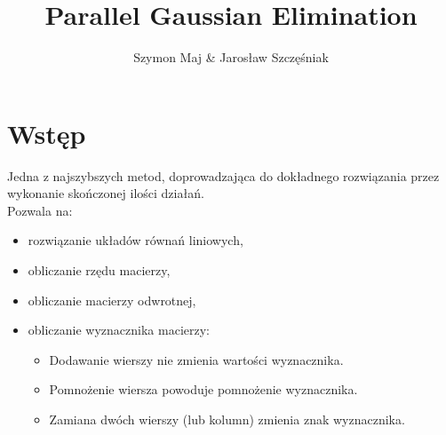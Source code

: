 \documentclass{beamer}
\title{Parallel Gaussian Elimination}
\author{Szymon Maj \& Jarosław Szczęśniak}
\institute{Akademia Górniczo-Hutnicza im. Stanisława Staszica w Krakowie}
\begin{document}
\lstset{breakatwhitespace=true,
language=C++,
columns=fullflexible,
keepspaces=true,
breaklines=true,
tabsize=3, 
showstringspaces=false,
extendedchars=true,
numbers=left,
numberstyle=\tiny,
frame=leftline}


	\begin{frame}
		\titlepage
	\end{frame}

	\section{Wstęp}
	\begin{frame}
		Jedna z najszybszych metod, doprowadzająca do dokładnego rozwiązania przez wykonanie skończonej ilości działań.
		\newline \\
		Pozwala na:
		\begin{itemize}
			\item rozwiązanie układów równań liniowych,
			\item obliczanie rzędu macierzy,
			\item obliczanie macierzy odwrotnej,
			\item obliczanie wyznacznika macierzy:
				\begin{itemize}
					\item Dodawanie wierszy nie zmienia wartości wyznacznika.
					\item Pomnożenie wiersza powoduje pomnożenie wyznacznika.
					\item Zamiana dwóch wierszy (lub kolumn) zmienia znak wyznacznika.
				\end{itemize}
		\end{itemize}
	\end{frame}
	
\end{document}
